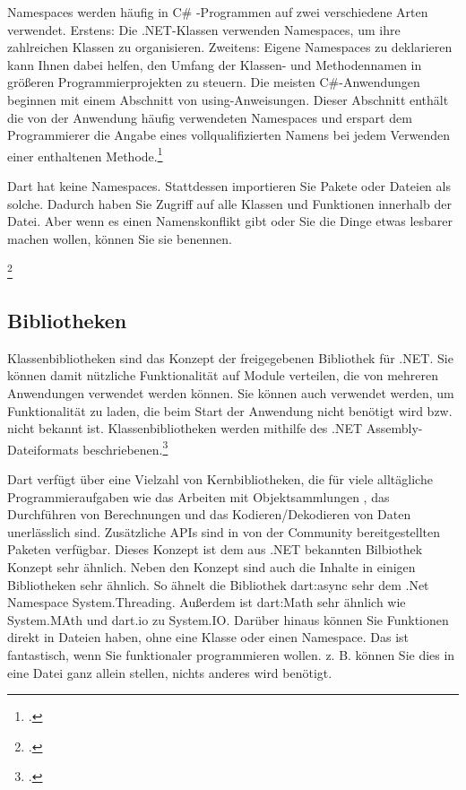 Namespaces werden häufig in C\# -Programmen auf zwei verschiedene Arten verwendet. Erstens: Die .NET-Klassen verwenden Namespaces, um ihre zahlreichen Klassen zu organisieren. Zweitens: Eigene Namespaces zu deklarieren kann Ihnen dabei helfen, den Umfang der Klassen- und Methodennamen in größeren Programmierprojekten zu steuern.
Die meisten C\#-Anwendungen beginnen mit einem Abschnitt von using-Anweisungen. Dieser Abschnitt enthält die von der Anwendung häufig verwendeten Namespaces und erspart dem Programmierer die Angabe eines vollqualifizierten Namens bei jedem Verwenden einer enthaltenen Methode.\footcite[Vgl.  Verwenden von Namespaces (C\#-Programmierhandbuch)][Abgerufen am \today]{GoogleFlutterSharedPreferences2020} 



Dart hat keine Namespaces. Stattdessen importieren Sie Pakete oder Dateien als solche.
Dadurch haben Sie Zugriff auf alle Klassen und Funktionen innerhalb der Datei. Aber wenn es einen Namenskonflikt gibt oder Sie die Dinge etwas lesbarer machen wollen, können Sie sie benennen.

\begin{minipage}{\linewidth}

\end{minipage}
\footcitetext[In Anlehnung an ][Abgerufen am \today]{Pedley2019}

\subsection{Bibliotheken}

Klassenbibliotheken sind das Konzept der freigegebenen Bibliothek für .NET. Sie können damit nützliche Funktionalität auf Module verteilen, die von mehreren Anwendungen verwendet werden können. Sie können auch verwendet werden, um Funktionalität zu laden, die beim Start der Anwendung nicht benötigt wird bzw. nicht bekannt ist. Klassenbibliotheken werden mithilfe des .NET Assembly-Dateiformats beschriebenen.\footcite[Vgl. .NET-Klassenbibliotheken
][Abgerufen am \today]{GoogleFlutterSharedPreferences2020} 

Dart verfügt über eine Vielzahl von Kernbibliotheken, die für viele alltägliche Programmieraufgaben wie das Arbeiten mit Objektsammlungen , das Durchführen von Berechnungen und das Kodieren/Dekodieren von Daten  unerlässlich sind.  Zusätzliche APIs sind in von der Community bereitgestellten Paketen verfügbar. Dieses Konzept ist dem aus .NET bekannten Bilbiothek Konzept sehr ähnlich.
Neben den Konzept sind auch die Inhalte in einigen Bibliotheken sehr ähnlich. So ähnelt die Bibliothek dart:async sehr dem .Net Namespace System.Threading.  Außerdem ist dart:Math sehr ähnlich wie System.MAth und dart.io zu System.IO.
Darüber hinaus können Sie Funktionen direkt in Dateien haben, ohne eine Klasse oder einen Namespace. Das ist fantastisch, wenn Sie funktionaler programmieren wollen. z. B. können Sie dies in eine Datei ganz allein stellen, nichts anderes wird benötigt.

